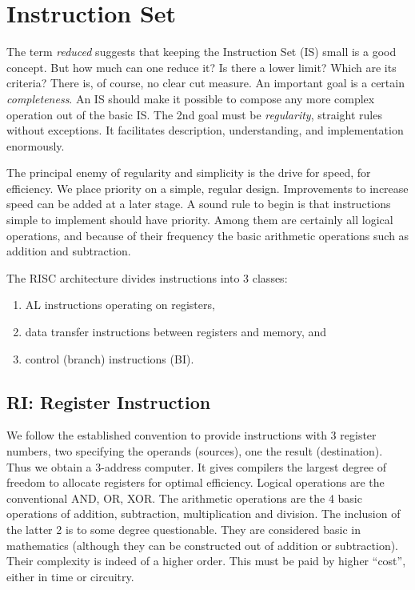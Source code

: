 \section{Instruction Set}
\label{ch:is}
The term \emph{reduced} suggests that keeping the Instruction Set (IS) small is a good concept. But
how much can one reduce it? Is there a lower limit? Which are its criteria? There is, of course, no
clear cut measure. An important goal is a certain \emph{completeness}. An IS should make it possible
to compose any more complex operation out of the basic IS. The 2nd goal must be \emph{regularity},
straight rules without exceptions. It facilitates description, understanding, and implementation
enormously.

The principal enemy of regularity and simplicity is the drive for speed, for efficiency. We place
priority on a simple, regular design. Improvements to increase speed can be added at a later stage.
A sound rule to begin is that instructions simple to implement should have priority. Among them are
certainly all logical operations, and because of their frequency the basic arithmetic operations
such as addition and subtraction.

The RISC architecture divides instructions into 3 classes:
\begin{enumerate}
  \item AL instructions operating on registers,
  \item data transfer instructions between registers and memory, and
  \item control (branch) instructions (BI).
\end{enumerate}

\subsection{RI: Register Instruction}
We follow the established convention to provide instructions with 3 register numbers, two specifying
the operands (sources), one the result (destination). Thus we obtain a 3-address computer. It gives
compilers the largest degree of freedom to allocate registers for optimal efficiency. Logical
operations are the conventional AND, OR, XOR. The arithmetic operations are the 4 basic
operations of addition, subtraction, multiplication and division. The inclusion of the latter 2 is to
some degree questionable. They are considered basic in mathematics (although they can be
constructed out of addition or subtraction). Their complexity is indeed of a higher order. This must be
paid by higher “cost”, either in time or circuitry.

